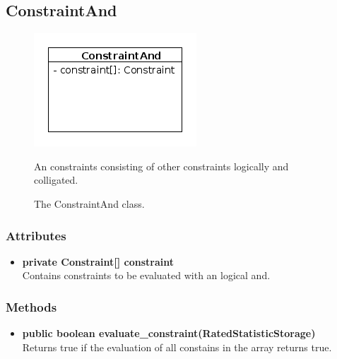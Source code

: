 \newpage
\subsection{ConstraintAnd}
\begin{figure}[htbp]
	\begin{minipage}[t]{8cm}
		\vspace{0pt}
		\centering
		\includegraphics[scale=0.6]{./diagram_pictures/reactor/ConstraintAnd.png}
		\caption{The ConstraintAnd class.}
	\end{minipage}
	\hfill
	\begin{minipage}[t]{8cm}
		\vspace{10pt}
			An constraints consisting of other constraints logically and colligated.
	\end{minipage}
\end{figure}  

\subsubsection{Attributes}
\begin{itemize}
	\item \textbf{ private Constraint[] constraint }\\
	Contains constraints to be evaluated with an logical and.
\end{itemize}
\subsubsection{Methods}
\begin{itemize}
	\item \textbf{ public boolean evaluate\_constraint(RatedStatisticStorage) }\\
	Returns true if the evaluation of all constains in the array returns true.
\end{itemize}


\newpage
